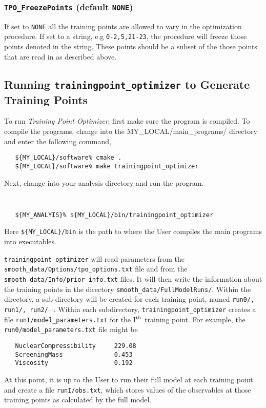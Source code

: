 \documentclass[UserManual.tex]{subfiles}
\begin{document}
\subsubsection{{\tt TPO\_FreezePoints} (default {\tt NONE})}
If set to {\tt NONE} all the training points are allowed to vary in the optimization procedure. If set to a string, e.g {\tt 0-2,5,21-23}, the procedure will freeze those points denoted in the string. These points should be a subset of the those points that are read in as described above.
 
\subsection{Running {\tt trainingpoint\_optimizer} to Generate Training Points}

To run {\it Training Point Optimizer}, first make sure the program is compiled. To compile the programs, change into the {MY\_LOCAL/main\_programs/} directory and enter the following command,

\begin{verbatim}
   ${MY_LOCAL}/software% cmake .
   ${MY_LOCAL}/software% make trainingpoint_optimizer
\end{verbatim}

Next, change into your analysis directory and run the program.
{\tt
\begin{verbatim}
   ${MY_ANALYIS}% ${MY_LOCAL}/bin/trainingpoint_optimizer 
\end{verbatim}
}
Here {\tt \$\{MY\_LOCAL\}/bin} is the path to where the User compiles the main programs into executables. 

{\tt trainingpoint\_optimizer} will read parameters from the {\tt smooth\_data/Options/tpo\_options.txt} file and from the {\tt smooth\_data/Info/prior\_info.txt} files. It will then write the information about the training points in the directory {\tt smooth\_data/FullModelRuns/}. Within the directory, a sub-directory will be created for each training point, named {\tt run0/, run1/, run2/}$\cdots$. Within each subdirectory, {\tt trainingpoint\_optimizer} creates a file {\tt runI/model\_parameters.txt} for the I$^{\rm th}$ training point. For example, the {\tt run0/model\_parameters.txt} file might be
{\tt\begin{verbatim}
   NuclearCompressibility     229.08
   ScreeningMass              0.453
   Viscosity                  0.192
\end{verbatim}
}
At this point, it is up to the User to run their full model at each training point and create a file {\tt runI/obs.txt}, which stores values of the observables at those training points as calculated by the full model. 
\end{document}
